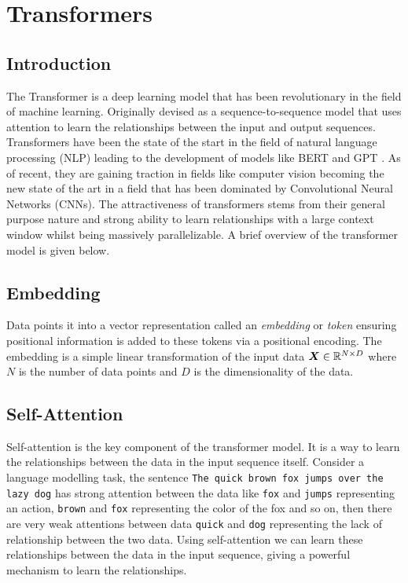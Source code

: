 \documentclass[../../main.tex]{subfiles}
\begin{document}
\section{Transformers}
\subsection{Introduction}

The Transformer \parencite{vaswani2017attention} is a deep learning model that has been revolutionary in the field of machine learning. Originally devised as a sequence-to-sequence model that uses attention to learn the relationships between the input and output sequences. Transformers have been the state of the start in the field of natural language processing (NLP) leading to the development of models like BERT \parencite{devlin2019bert} and GPT \parencite{brown2020language}. As of recent, they are gaining traction in fields like computer vision \parencite{dosovitskiy2021image} becoming the new state of the art in a field that has been dominated by Convolutional Neural Networks (CNNs). The attractiveness of transformers stems from their general purpose nature and strong ability to learn relationships with a large context window whilst being massively parallelizable. A brief overview of the transformer model is given below.


\subsection{Embedding}

Data points it into a vector representation called an \emph{embedding} or \emph{token} ensuring positional information is added to these tokens via a positional encoding. The embedding is a simple linear transformation of the input data $\bm{X} \in \mathbb{R}^{N \times D}$ where $N$ is the number of data points and $D$ is the dimensionality of the data. 

\subsection{Self-Attention}

 Self-attention is the key component of the transformer model. It is a way to learn the relationships between the data in the input sequence itself.  Consider a language modelling task, the sentence \texttt{The quick brown fox jumps over the lazy dog} has strong attention between the data like \texttt{fox} and \texttt{jumps} representing an action, \texttt{brown} and \texttt{fox} representing the color of the fox and so on, then there are very weak attentions between data \texttt{quick} and \texttt{dog} representing the lack of relationship between the two data. Using self-attention we can learn these relationships between the data in the input sequence, giving a powerful mechanism to learn the relationships.
\end{document}
